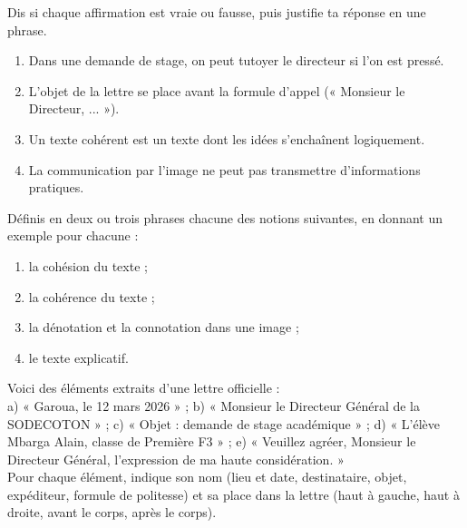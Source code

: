 \documentclass[11pt]{article}
\newcommand{\cle}[1]{{\popxbold\color{popdark}#1}}
\newcounter{popsec}
\newcounter{popsub}
\newcommand{\courssub}[1]{%
  \stepcounter{popsub}%
  \par\vspace{9pt}\noindent{\popxbold\fontsize{11.5}{13}\selectfont\color{popink}{\color{poporange}\thepopsec.\thepopsub}\hspace{6pt}#1}\par\nopagebreak\vspace{4pt}
}
\begin{document}
\begin{exercice}
Dis si chaque affirmation est vraie ou fausse, puis justifie ta réponse en une phrase.
\begin{enumerate}
\item Dans une demande de stage, on peut tutoyer le directeur si l'on est pressé.
\item L'objet de la lettre se place avant la formule d'appel (« Monsieur le Directeur, ... »).
\item Un texte cohérent est un texte dont les idées s'enchaînent logiquement.
\item La communication par l'image ne peut pas transmettre d'informations pratiques.
\end{enumerate}
\end{exercice}

\begin{exercice}[Définitions]
Définis en deux ou trois phrases chacune des notions suivantes, en donnant un exemple pour chacune :
\begin{enumerate}
\item la \cle{cohésion} du texte ;
\item la \cle{cohérence} du texte ;
\item la \cle{dénotation} et la \cle{connotation} dans une image ;
\item le \cle{texte explicatif}.
\end{enumerate}
\end{exercice}

\begin{exercice}
Voici des éléments extraits d'une lettre officielle :\\
a) « Garoua, le 12 mars 2026 » ; b) « Monsieur le Directeur Général de la SODECOTON » ; c) « Objet : demande de stage académique » ; d) « L'élève Mbarga Alain, classe de Première F3 » ; e) « Veuillez agréer, Monsieur le Directeur Général, l'expression de ma haute considération. »\\
Pour chaque élément, indique son nom (lieu et date, destinataire, objet, expéditeur, formule de politesse) et sa place dans la lettre (haut à gauche, haut à droite, avant le corps, après le corps).
\end{exercice}

\courssub{Je m'entraîne}
\end{document}
